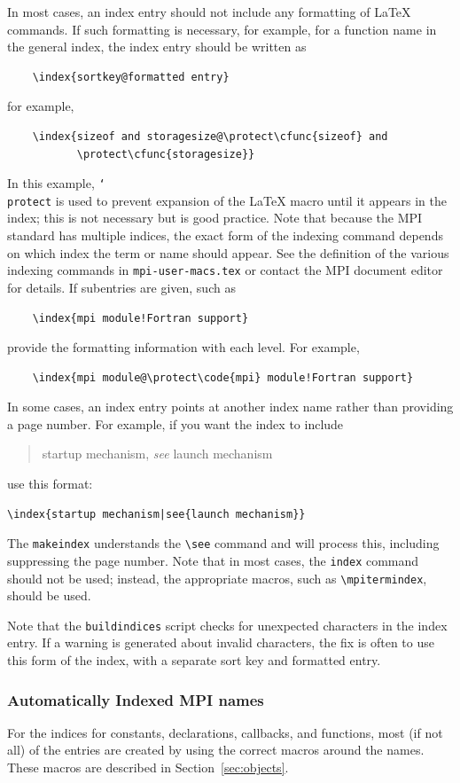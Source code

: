 \documentclass[letterpaper,twoside,11pt,fleqn]{article}
\def\cmd#1{\texttt{\char`\\#1}}
\def\MPI/{\textsf{MPI}}    %
\begin{document}
In most cases, an index entry should not include any formatting of
LaTeX commands.
If such formatting is necessary, for example, for a function name in
the general index, the index entry should be written as
\begin{verbatim}
    \index{sortkey@formatted entry}
\end{verbatim}
for example,
\begin{verbatim}
    \index{sizeof and storagesize@\protect\cfunc{sizeof} and
           \protect\cfunc{storagesize}}
\end{verbatim}
In this example, \cmd{protect} is used to prevent expansion of the
  LaTeX macro until it appears in the index; this is not necessary but
  is good practice.
Note that because the \MPI/ standard has multiple indices, the exact
form of the indexing command depends on which index the term or name
should appear.
See the definition of the various indexing commands in
\texttt{mpi-user-macs.tex} or contact the \MPI/ document editor for
details.
If subentries are given, such as
\begin{verbatim}
    \index{mpi module!Fortran support}
\end{verbatim}
provide the formatting information with each level.  For example,
\begin{verbatim}
    \index{mpi module@\protect\code{mpi} module!Fortran support}
\end{verbatim}

In some cases, an index entry points at another index name rather than
providing a page number.
For example, if you want the index to include
\begin{quote}
startup mechanism, \emph{see} launch mechanism
\end{quote}
use this format:
\begin{verbatim}
\index{startup mechanism|see{launch mechanism}}
\end{verbatim}
The \texttt{makeindex} understands the \verb+\see+ command and will
process this, including suppressing the page number.
Note that in most cases, the \verb+index+ command should not be used;
instead, the appropriate macros, such as \verb+\mpitermindex+, should
be used.

Note that the \texttt{buildindices} script checks for unexpected
characters in the index entry.
If a warning is generated about invalid characters, the fix is often
to use this form of the index, with a separate sort key and formatted entry.

\subsubsection{Automatically Indexed \texorpdfstring{\MPI/}{MPI} names}
For the indices for constants, declarations, callbacks, and functions, most (if
not all) of the entries are created by using the correct macros around
the names.  These macros are described in Section~\ref{sec:objects}.
\end{document}
